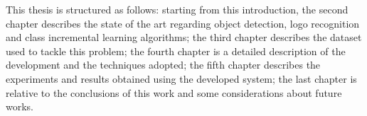 \vspace{1.5\baselineskip}
This thesis is structured as follows: starting from this introduction, the second chapter describes the state of the art regarding object detection, logo recognition and class incremental learning algorithms; the third chapter describes the dataset used to tackle this problem; the fourth chapter is a detailed description of the development and the techniques adopted; the fifth chapter describes the experiments and results obtained using the developed system; the last chapter is relative to the conclusions of this work and some considerations about future works.